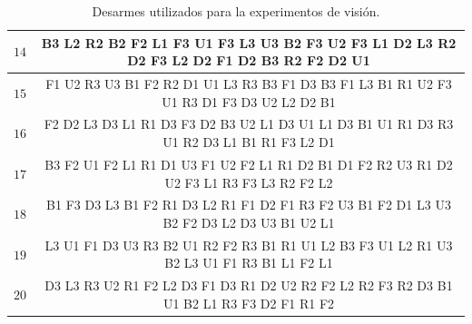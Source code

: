 {\begin{table}[h!]
{\begin{tabular}{|r|c|}
		$14$ & B3 L2 R2 B2 F2 L1 F3 U1 F3 L3 U3 B2 F3 U2 F3 L1 D2 L3 R2 D2 F3 L2 D2 F1 D2 B3 R2 F2 D2 U1 \\ \hline
		$15$ & F1 U2 R3 U3 B1 F2 R2 D1 U1 L3 R3 B3 F1 D3 B3 F1 L3 B1 R1 U2 F3 U1 R3 D1 F3 D3 U2 L2 D2 B1 \\ \hline
		$16$ & F2 D2 L3 D3 L1 R1 D3 F3 D2 B3 U2 L1 D3 U1 L1 D3 B1 U1 R1 D3 R3 U1 R2 D3 L1 B1 R1 F3 L2 D1 \\ \hline
		$17$ & B3 F2 U1 F2 L1 R1 D1 U3 F1 U2 F2 L1 R1 D2 B1 D1 F2 R2 U3 R1 D2 U2 F3 L1 R3 F3 L3 R2 F2 L2 \\ \hline
		$18$ & B1 F3 D3 L3 B1 F2 R1 D3 L2 R1 F1 D2 F1 R3 F2 U3 B1 F2 D1 L3 U3 B2 F2 D3 L2 D3 U3 B1 U2 L1 \\ \hline
		$19$ & L3 U1 F1 D3 U3 R3 B2 U1 R2 F2 R3 B1 R1 U1 L2 B3 F3 U1 L2 R1 U3 B2 L3 U1 F1 R3 B1 L1 F2 L1 \\ \hline
		$20$ & D3 L3 R3 U2 R1 F2 L2 D3 F1 D3 R1 D2 U2 R2 F2 L2 R2 F3 R2 D3 B1 U1 B2 L1 R3 F3 D2 F1 R1 F2 \\ \hline
	\end{tabular}
	}
	\caption{Desarmes utilizados para la experimentos de visión.}
	\label{vision}
\end{table}
\newpage
}
